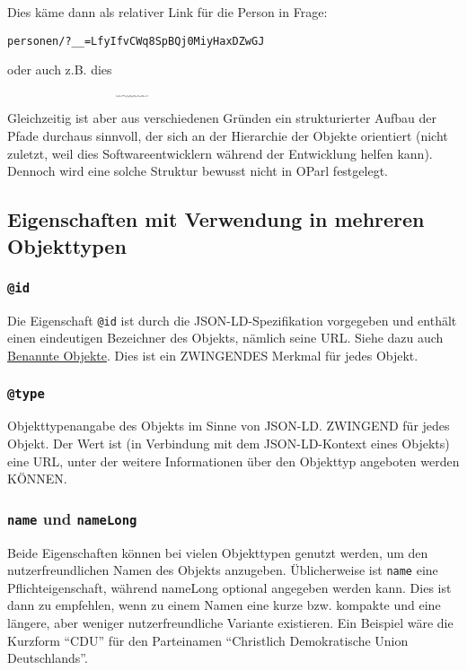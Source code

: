 \documentclass[,a4paper]{article}
\begin{document}
Dies käme dann als relativer Link für die Person in Frage:

\begin{verbatim}
personen/?__=LfyIfvCWq8SpBQj0MiyHaxDZwGJ
\end{verbatim}

oder auch z.B. dies
\textsubscript{\textsubscript{\textsubscript{\textsubscript{\textsubscript{\textsubscript{\textsubscript{\textsubscript{\textsubscript{\textsubscript{
LfyIfvCWq8SpBQj0MiyHaxDZwGJ }}}}}}}}}}

Gleichzeitig ist aber aus verschiedenen Gründen ein strukturierter
Aufbau der Pfade durchaus sinnvoll, der sich an der Hierarchie der
Objekte orientiert (nicht zuletzt, weil dies Softwareentwicklern während
der Entwicklung helfen kann). Dennoch wird eine solche Struktur bewusst
nicht in OParl festgelegt.

\subsection{Eigenschaften mit Verwendung in mehreren
Objekttypen}\label{eigenschaften-mit-verwendung-in-mehreren-objekttypen}

\subsubsection{\texttt{@id}}\label{id}

Die Eigenschaft \texttt{@id} ist durch die JSON-LD-Spezifikation
vorgegeben und enthält einen eindeutigen Bezeichner des Objekts, nämlich
seine URL. Siehe dazu auch \hyperref[benannteux5fobjekte]{Benannte
Objekte}. Dies ist ein ZWINGENDES Merkmal für jedes Objekt.

\subsubsection{\texttt{@type}}\label{type}

Objekttypenangabe des Objekts im Sinne von JSON-LD. ZWINGEND für jedes
Objekt. Der Wert ist (in Verbindung mit dem JSON-LD-Kontext eines
Objekts) eine URL, unter der weitere Informationen über den Objekttyp
angeboten werden KÖNNEN.

\subsubsection{\texttt{name} und
\texttt{nameLong}}\label{name-und-namelong}

Beide Eigenschaften können bei vielen Objekttypen genutzt werden, um den
nutzerfreundlichen Namen des Objekts anzugeben. Üblicherweise ist
\texttt{name} eine Pflichteigenschaft, während nameLong optional
angegeben werden kann. Dies ist dann zu empfehlen, wenn zu einem Namen
eine kurze bzw. kompakte und eine längere, aber weniger
nutzerfreundliche Variante existieren. Ein Beispiel wäre die Kurzform
``CDU'' für den Parteinamen ``Christlich Demokratische Union
Deutschlands''.
\end{document}
